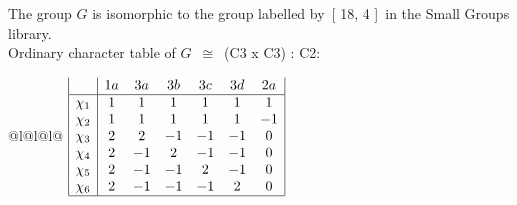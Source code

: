 \documentclass[varwidth=\maxdimen,border=10]{standalone}
\begin{document}
The group $G$ is isomorphic to the group labelled by\ [ 18, 4 ]\ in the Small Groups library.\\
Ordinary character table of $G$\ $\cong$\ (C3 x C3) : C2:\\
\begin{center}
\begin{tabular}{@{}l@{}l@{}l@{}}
\hline
\(\begin{array}{|l|cccccc|}
  & 1a & 3a & 3b & 3c & 3d & 2a\\ \hline
\chi_{1} & 1 & 1 & 1 & 1 & 1 & 1\\
\chi_{2} & 1 & 1 & 1 & 1 & 1 & -1\\
\chi_{3} & 2 & 2 & -1 & -1 & -1 & 0\\
\chi_{4} & 2 & -1 & 2 & -1 & -1 & 0\\
\chi_{5} & 2 & -1 & -1 & 2 & -1 & 0\\
\chi_{6} & 2 & -1 & -1 & -1 & 2 & 0\\
\hline
\end{array}\)\\
\end{tabular}
\end{center}
\end{document}
